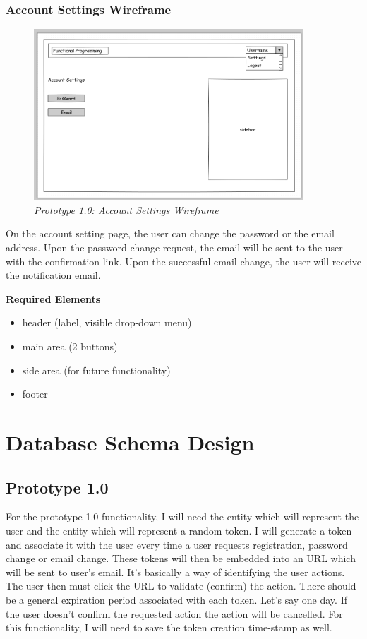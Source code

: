 \documentclass[12pt,twoside,a4paper]{report}
\begin{document}
\subsubsection{Account Settings Wireframe}\label{3.7.1.3}
\begin{figure}[!ht]
	\centering
		\includegraphics[width=0.9\textwidth, totalheight=7cm]
		{wireframe_account_settings}
	\caption{\textit{Prototype 1.0: Account Settings Wireframe}}
	\label{f3.7.1.3}
\end{figure}

On the account setting page, the user can change the password or the email address. Upon the password change request, the email will be sent to the user with the confirmation link. Upon the successful email change, the user will receive the notification email.

\textbf{Required Elements}
\begin{itemize}
\item header (label, visible drop-down menu)
\item main area (2 buttons)
\item side area (for future functionality)
\item footer
\end{itemize}

\section{Database Schema Design}\label{3.8}
\subsection{Prototype 1.0}\label{3.8.1}

For the prototype 1.0 functionality, I will need the entity which will represent the user and the entity which will represent a random token. I will generate a token and associate it with the user every time a user requests registration, password change or email change. These tokens will then be embedded into an URL which will be sent to user's email. It's basically a way of identifying the user actions. The user then must click the URL to validate (confirm) the action. There should be a general expiration period associated with each token. Let's say one day. If the user doesn't confirm the requested action the action will be cancelled. For this functionality, I will need to save the token creation time-stamp as well.
\end{document}
